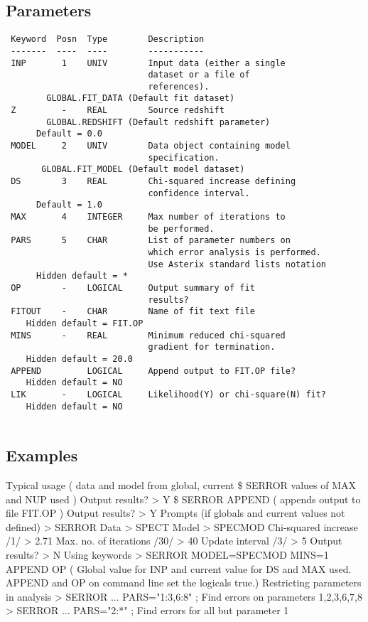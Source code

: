 \documentclass{book}
\renewcommand{\_}{{\tt\char'137}}     %
\begin{document}
\subsection{Parameters}
\begin{verbatim}
 Keyword  Posn  Type        Description
 -------  ----  ----        -----------
 INP       1    UNIV        Input data (either a single
                            dataset or a file of
                            references).
        GLOBAL.FIT_DATA (Default fit dataset)
 Z         -    REAL        Source redshift
        GLOBAL.REDSHIFT (Default redshift parameter)
      Default = 0.0
 MODEL     2    UNIV        Data object containing model
                            specification.
       GLOBAL.FIT_MODEL (Default model dataset)
 DS        3    REAL        Chi-squared increase defining
                            confidence interval.
      Default = 1.0
 MAX       4    INTEGER     Max number of iterations to
                            be performed.
 PARS      5    CHAR        List of parameter numbers on
                            which error analysis is performed.
                            Use Asterix standard lists notation
      Hidden default = *
 OP        -    LOGICAL     Output summary of fit
                            results?
 FITOUT    -    CHAR        Name of fit text file
    Hidden default = FIT.OP
 MINS      -    REAL        Minimum reduced chi-squared
                            gradient for termination.
    Hidden default = 20.0
 APPEND         LOGICAL     Append output to FIT.OP file?
    Hidden default = NO
 LIK       -    LOGICAL     Likelihood(Y) or chi-square(N) fit?
    Hidden default = NO
 
\end{verbatim}\subsection{Examples}
Typical usage
( data and model from global, current
\$ SERROR values of MAX and NUP used )
Output results? > Y
\$ SERROR APPEND ( appends output to file FIT.OP )
Output results? > Y
Prompts (if globals and current values not defined)
> SERROR
Data > SPECT
Model > SPECMOD
Chi-squared increase /1/ > 2.71
Max. no. of iterations /30/ > 40
Update interval /3/ > 5
Output results? > N
Using keywords
> SERROR MODEL=SPECMOD MINS=1 APPEND OP
( Global value for INP and current value for DS and
MAX used. APPEND and OP on command line set the
logicals true.)
Restricting parameters in analysis
> SERROR ... PARS="1:3,6:8" ; Find errors on parameters
1,2,3,6,7,8
> SERROR ... PARS="2:*" ; Find errors for all but
parameter 1
\end{document}
